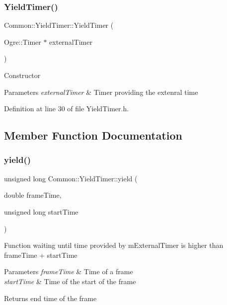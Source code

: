 \subsubsection{\texorpdfstring{Yield\+Timer()}{YieldTimer()}}
{\footnotesize\ttfamily Common\+::\+Yield\+Timer\+::\+Yield\+Timer (\begin{DoxyParamCaption}\item[{Ogre\+::\+Timer $\ast$}]{external\+Timer }\end{DoxyParamCaption})\hspace{0.3cm}{\ttfamily [inline]}}

Constructor 
\begin{DoxyParams}{Parameters}
{\em external\+Timer} & Timer providing the extenral time \\
\hline
\end{DoxyParams}


Definition at line 30 of file Yield\+Timer.\+h.



\subsection{Member Function Documentation}
\mbox{\label{class_common_1_1_yield_timer_a55ba2e4b796cc59768c5200cc38d303c}} 
\subsubsection{\texorpdfstring{yield()}{yield()}}
{\footnotesize\ttfamily unsigned long Common\+::\+Yield\+Timer\+::yield (\begin{DoxyParamCaption}\item[{double}]{frame\+Time,  }\item[{unsigned long}]{start\+Time }\end{DoxyParamCaption})\hspace{0.3cm}{\ttfamily [inline]}}

Function waiting until time provided by m\+External\+Timer is higher than frame\+Time + start\+Time 
\begin{DoxyParams}{Parameters}
{\em frame\+Time} & Time of a frame \\
\hline
{\em start\+Time} & Time of the start of the frame \\
\hline
\end{DoxyParams}
\begin{DoxyReturn}{Returns}
end time of the frame 
\end{DoxyReturn}


